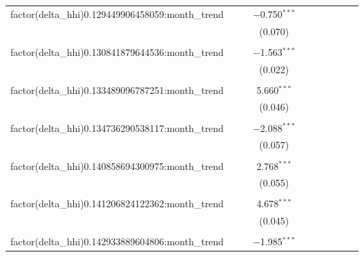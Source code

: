 \begin{table}[H]
{\begin{tabular}{@{\extracolsep{5pt}}lccccccccc}
  factor(delta\_hhi)0.129449906458059:month\_trend &  &  & $-$0.750$^{***}$ &  &  &  &  &  &  \\  

   &  &  & (0.070) &  &  &  &  &  &  \\  

   & & & & & & & & & \\  

  factor(delta\_hhi)0.130841879644536:month\_trend &  &  & $-$1.563$^{***}$ &  &  &  &  &  &  \\  

   &  &  & (0.022) &  &  &  &  &  &  \\  

   & & & & & & & & & \\  

  factor(delta\_hhi)0.133489096787251:month\_trend &  &  & 5.660$^{***}$ &  &  &  &  &  &  \\  

   &  &  & (0.046) &  &  &  &  &  &  \\  

   & & & & & & & & & \\  

  factor(delta\_hhi)0.134736290538117:month\_trend &  &  & $-$2.088$^{***}$ &  &  &  &  &  &  \\  

   &  &  & (0.057) &  &  &  &  &  &  \\  

   & & & & & & & & & \\  

  factor(delta\_hhi)0.140858694300975:month\_trend &  &  & 2.768$^{***}$ &  &  &  &  &  &  \\  

   &  &  & (0.055) &  &  &  &  &  &  \\  

   & & & & & & & & & \\  

  factor(delta\_hhi)0.141206824122362:month\_trend &  &  & 4.678$^{***}$ &  &  &  &  &  &  \\  

   &  &  & (0.045) &  &  &  &  &  &  \\  

   & & & & & & & & & \\  

  factor(delta\_hhi)0.142933889604806:month\_trend &  &  & $-$1.985$^{***}$ &  &  &  &  &  &  \\  


\end{tabular}}
\end{table}
